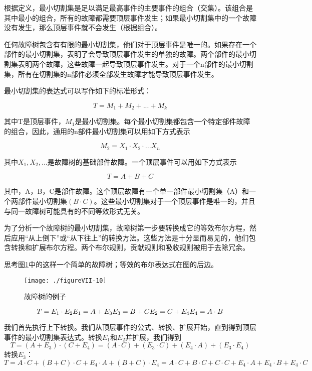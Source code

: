\documentclass[cn,11pt,chinese]{elegantbook}
\begin{document}
{根据定义，最小切割集是足以满足最高事件的主要事件的组合（交集）。该组合是其中最小的组合，所有的故障都需要顶层事件发生；如果最小切割集中的一个故障没有发生，那么顶层事件就不会发生（根据组合）。

任何故障树包含有有限的最小切割集，他们对于顶层事件是唯一的。如果存在一个部件的最小切割集，表明了会导致顶层事件发生的单独的故障。两个部件的最小切割集表明两个故障，这些故障一起导致顶层事件发生。对于一个n部件的最小切割集，所有在切割集的n部件必须全部发生故障才能导致顶层事件发生。

最小切割集的表达式可以写作如下的标准形式：

$$T=M_1+M_2+...+M_k$$

其中T是顶层事件，$M_1$是最小切割集。每个最小切割集都包含一个特定部件故障的组合，因此，通用的n部件最小切割集可以用如下方式表示

$$M_2=X_1 \cdot X_2 \cdot ...X_n$$

其中$X_1,X_2,...$是故障树的基础部件故障。一个顶层事件可以用如下方式表示

$$T=A+B+C$$

其中，A，B，C是部件故障。这个顶层故障有一个单一部件最小切割集（A）和一个两部件最小切割集$(B\cdot C)$。这些最小切割集对于一个顶层事件是唯一的，并且与同一故障树可能具有的不同等效形式无关。

为了分析一个故障树的最小切割集，故障树第一步要转换成它的等效布尔方程，然后应用“从上倒下”或“从下往上”的转换方法。这些方法是十分显而易见的，他们包含转换和扩展布尔方程。两个布尔规则，贡献规则和吸收规则被用于去除冗余。

思考图\ref{fig7-10}中的这样一个简单的故障树；等效的布尔表达式在图的后边。

\begin{figure}[H]
	\centering
	\texttt{[image: ./figureVII-10]}
	\caption{故障树的例子}\label{fig7-10}
\end{figure}


$$
T=E_1\cdot E_2 \\
E_1=A+E_3   \\
E_3=B+C \\
E_2=C+E_4   \\
E_4=A \cdot B    \\
$$

我们首先执行上下转换。我们从顶层事件的公式、转换、扩展开始，直到得到顶层事件的最小切割集表达式。转换$E_1$和$E_2$并扩展，我们得到
$$T=(A+E_3)\cdot (C+E_4)=(A\cdot C)+(E_3\cdot C)+(E_4\cdot A)+(E_3\cdot E_4)$$
转换$E_3$：
$$
T=A\cdot C+(B+C)\cdot C+E_4\cdot A+(B+C)\cdot E_4 = A\cdot C+B\cdot C+C\cdot C+E_4\cdot A+E_4\cdot B+E_4\cdot C$$

}
\end{document}
